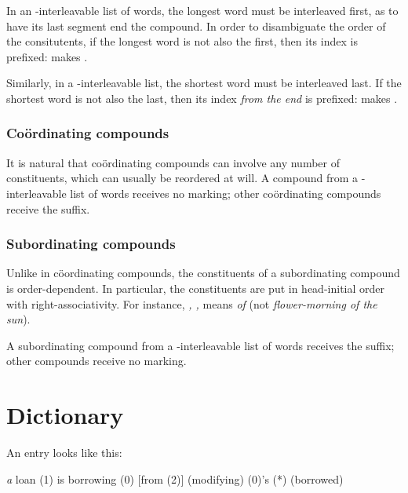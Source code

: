 \documentclass{book}
\begin{document}
In an \tiaug-interleavable list of words, the longest word must be interleaved first, as to have its last segment end the compound. In order to disambiguate the order of the consitutents, if the longest word is not also the first, then its index is prefixed:  makes .

Similarly, in a \tidim-interleavable list, the shortest word must be interleaved last. If the shortest word is not also the last, then its index \emph{from the end} is prefixed:  makes .

\subsection{Coördinating compounds}

It is natural that coördinating compounds can involve any number of constituents, which can usually be reordered at will. A compound from a \tieq-interleavable list of words receives no marking; other coördinating compounds receive the  suffix.

\subsection{Subordinating compounds}

Unlike in cöordinating compounds, the constituents of a subordinating compound is order-dependent. In particular, the constituents are put in head-initial order with right-associativity. For instance,  \emph{, , } means \emph{ of } (not \emph{flower-morning of the sun}).

A subordinating compound from a \tieq-interleavable list of words receives the  suffix; other compounds receive no marking.

\appendix

\chapter{Dictionary}

An entry looks like this:

 \textit{a}
\quad loan \quad (1) is borrowing (0) [from (2)] \quad (modifying) (0)'s (*) (borrowed)
\end{document}
